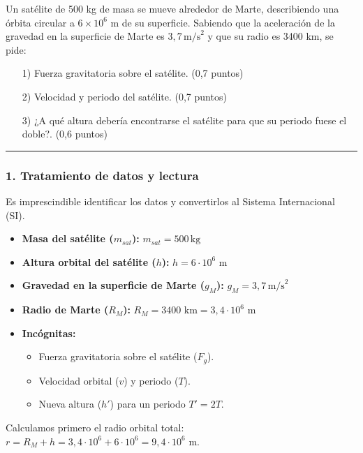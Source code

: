 \begin{cajaenunciado}
Un satélite de 500 kg de masa se mueve alrededor de Marte, describiendo una órbita circular a $6\times10^6$ m de su superficie. Sabiendo que la aceleración de la gravedad en la superficie de Marte es $3,7\,\text{m/s}^2$ y que su radio es 3400 km, se pide:
\begin{enumerate}
    \item[1)] Fuerza gravitatoria sobre el satélite. (0,7 puntos)
    \item[2)] Velocidad y periodo del satélite. (0,7 puntos)
    \item[3)] ¿A qué altura debería encontrarse el satélite para que su periodo fuese el doble?. (0,6 puntos)
\end{enumerate}
\end{cajaenunciado}
\hrule

\subsubsection*{1. Tratamiento de datos y lectura}
Es imprescindible identificar los datos y convertirlos al Sistema Internacional (SI).
\begin{itemize}
    \item \textbf{Masa del satélite ($m_{sat}$):} $m_{sat} = 500 \, \text{kg}$
    \item \textbf{Altura orbital del satélite ($h$):} $h = 6 \cdot 10^6 \text{ m}$
    \item \textbf{Gravedad en la superficie de Marte ($g_M$):} $g_M = 3,7 \, \text{m/s}^2$
    \item \textbf{Radio de Marte ($R_M$):} $R_M = 3400 \text{ km} = 3,4 \cdot 10^6 \text{ m}$
    \item \textbf{Incógnitas:}
    \begin{itemize}
        \item Fuerza gravitatoria sobre el satélite ($F_g$).
        \item Velocidad orbital ($v$) y periodo ($T$).
        \item Nueva altura ($h'$) para un periodo $T' = 2T$.
    \end{itemize}
\end{itemize}
Calculamos primero el radio orbital total: $r = R_M + h = 3,4 \cdot 10^6 + 6 \cdot 10^6 = 9,4 \cdot 10^6 \text{ m}$.


